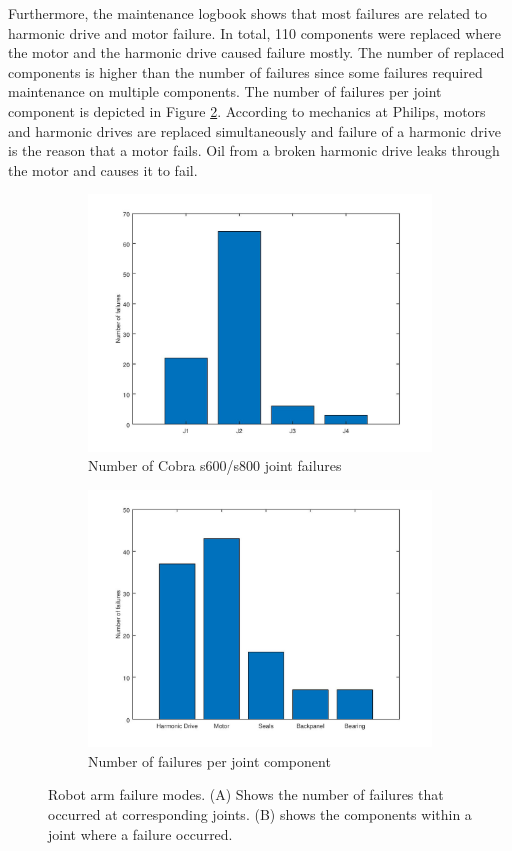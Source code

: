 Furthermore, the maintenance logbook shows that most failures are related to harmonic drive and motor failure. In total, 110 components were replaced where the motor and the harmonic drive caused failure mostly. The number of replaced components is higher than the number of failures since some failures required maintenance on multiple components. The number of failures per joint component is depicted in Figure \ref{fig:Joint failure component}. According to mechanics at Philips, motors and harmonic drives are replaced simultaneously and failure of a harmonic drive is the reason that a motor fails. Oil from a broken harmonic drive leaks through the motor and causes it to fail. 
\begin{figure}[ht]
\begin{subfigure}{.5\textwidth}
\centering
\includegraphics[width=.9\linewidth]{Figures/Cobra_joint_failures}
\caption[Number of Cobra s600/s800 joint failures]{Number of Cobra s600/s800 joint failures}
\label{fig:Cobra joint failures}
\end{subfigure}
\begin{subfigure}{.5\textwidth}
\centering
\includegraphics[width=.9\linewidth]{Figures/Joint_failure_component}
\caption[Number of failures per joint component]{Number of failures per joint component}
\label{fig:Joint failure component}
\end{subfigure}
\caption[Failure modes]{Robot arm failure modes. ({\tiny{A}}) Shows the number of failures that occurred at corresponding joints. ({\tiny{B}}) shows the components within a joint where a failure occurred.}
\label{fig:Failure data}
\end{figure}
